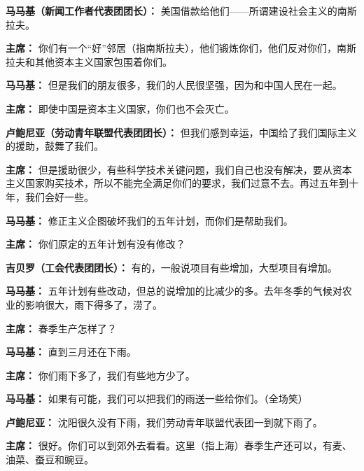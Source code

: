 \begin{duihua}
\item[\textbf{马马基（新闻工作者代表团团长）：}] 美国借款给他们——所谓建设社会主义的南斯拉夫。

\item[\textbf{主席：}] 你们有一个“好”邻居（指南斯拉夫），他们锻炼你们，他们反对你们，南斯拉夫和其他资本主义国家包围着你们。

\item[\textbf{马马基：}] 但是我们的朋友很多，我们的人民很坚强，因为和中国人民在一起。

\item[\textbf{主席：}] 即使中国是资本主义国家，你们也不会灭亡。

\item[\textbf{卢鲍尼亚（劳动青年联盟代表团团长）：}] 但我们感到幸运，中国给了我们国际主义的援助，鼓舞了我们。

\item[\textbf{主席：}] 但是援助很少，有些科学技术关键问题，我们自己也没有解决，要从资本主义国家购买技术，所以不能完全满足你们的要求，我们过意不去。再过五年到十年，我们会好一些。

\item[\textbf{马马基：}] 修正主义企图破坏我们的五年计划，而你们是帮助我们。

\item[\textbf{主席：}] 你们原定的五年计划有没有修改？

\item[\textbf{吉贝罗（工会代表团团长）：}] 有的，一般说项目有些增加，大型项目有增加。

\item[\textbf{马马基：}] 五年计划有些改动，但总的说增加的比减少的多。去年冬季的气候对农业的影响很大，雨下得多了，涝了。

\item[\textbf{主席：}] 春季生产怎样了？

\item[\textbf{马马基：}] 直到三月还在下雨。

\item[\textbf{主席：}] 你们雨下多了，我们有些地方少了。

\item[\textbf{马马基：}] 如果有可能，我们可以把我们的雨送一些给你们。（全场笑）

\item[\textbf{卢鲍尼亚：}] 沈阳很久没有下雨，我们劳动青年联盟代表团一到就下雨了。

\item[\textbf{主席：}] 很好。你们可以到郊外去看看。这里（指上海）春季生产还可以，有麦、油菜、蚕豆和豌豆。


\end{duihua}
